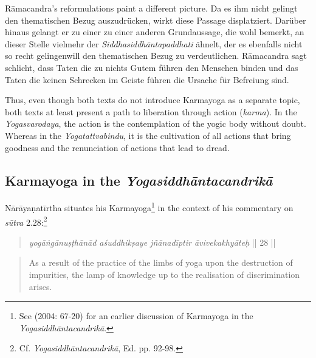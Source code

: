   Rāmacandra's reformulations paint a different picture. Da es ihm nicht gelingt den thematischen Bezug auszudrücken, wirkt diese Passage displatziert. Darüber hinaus gelangt er zu einer zu einer anderen Grundaussage, die wohl bemerkt, an dieser Stelle vielmehr der \emph{Siddhasiddhāntapaddhati} ähnelt, der es ebenfalls nicht so recht gelingenwill den thematischen Bezug zu verdeutlichen. Rāmacandra sagt schlicht, dass Taten die zu nichts Gutem führen den Menschen binden und das Taten die keinen Schrecken im Geiste führen die Ursache für Befreiung sind.
  
Thus, even though both texts do not introduce Karmayoga as a separate topic, both texts at least present a path to liberation through action (\textit{karma}). In the \textit{Yogasvarodaya}, the action is the contemplation of the yogic body without doubt. Whereas in the \textit{Yogatattvabindu}, it is the cultivation of all actions that bring goodness and the renunciation of actions that lead to dread. 

\subsection{Karmayoga in the \textit{Yogasiddhāntacandrikā}}

Nārāyaṇatīrtha situates his Karmayoga\footnote{See \citeauthor{penna2004} (2004: 67-20) for an earlier discussion of Karmayoga in the \textit{Yogasiddhāntacandrikā}.} in the context of his commentary on \textit{sūtra} 2.28:\footnote{Cf. \textit{Yogasiddhāntacandrikā}, Ed. pp. 92-98.}

\begin{quote}
  \textit{yogāṅgānuṣṭhānād aśuddhikṣaye jñānadīptir āvivekakhyāteḥ} || 28 ||
\end{quote}
\begin{quote}
As a result of the practice of the limbs of yoga upon the destruction of impurities, the lamp of knowledge up to the realisation of discrimination arises.
\end{quote}

